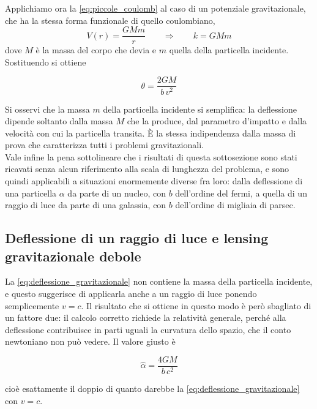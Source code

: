 Applichiamo ora la \eqref{eq:piccole_coulomb} al caso di un potenziale gravitazionale, che ha la stessa forma funzionale di quello coulombiano,
\begin{equation*}
    V(r) = \frac{GMm}{r} \qquad \Longrightarrow \qquad k = GMm
\end{equation*}
dove $M$ è la massa del corpo che devia e $m$ quella della particella incidente. Sostituendo si ottiene

\begin{tcolorbox}[colback=black!5!white, colframe=black!45!white, boxrule=0.8pt]
\begin{equation}
    \theta = \frac{2GM}{b \, v^2}
    \label{eq:deflessione_gravitazionale}
\end{equation}
\end{tcolorbox}
Si osservi che la massa $m$ della particella incidente si semplifica: la deflessione dipende soltanto dalla massa $M$ che la produce, dal parametro d'impatto e dalla velocità con cui la particella transita. È la stessa indipendenza dalla massa di prova che caratterizza tutti i problemi gravitazionali.\\

Vale infine la pena sottolineare che i risultati di questa sottosezione sono stati ricavati senza alcun riferimento alla scala di lunghezza del problema, e sono quindi applicabili a situazioni enormemente diverse fra loro: dalla deflessione di una particella $\alpha$ da parte di un nucleo, con $b$ dell'ordine del fermi, a quella di un raggio di luce da parte di una galassia, con $b$ dell'ordine di migliaia di parsec.

\subsection*{Deflessione di un raggio di luce e lensing gravitazionale debole}

La \eqref{eq:deflessione_gravitazionale} non contiene la massa della particella incidente, e questo suggerisce di applicarla anche a un raggio di luce ponendo semplicemente $v = c$. Il risultato che si ottiene in questo modo è però sbagliato di un fattore due: il calcolo corretto richiede la relatività generale, perché alla deflessione contribuisce in parti uguali la curvatura dello spazio, che il conto newtoniano non può vedere. 
\newpage
Il valore giusto è

\begin{tcolorbox}[colback=black!5!white, colframe=black!45!white, boxrule=0.8pt]
\begin{equation}
    \hat\alpha = \frac{4GM}{b \, c^2}
    \label{eq:deflessione_luce}
\end{equation}
\end{tcolorbox}
cioè esattamente il doppio di quanto darebbe la \eqref{eq:deflessione_gravitazionale} con $v = c$.\\

